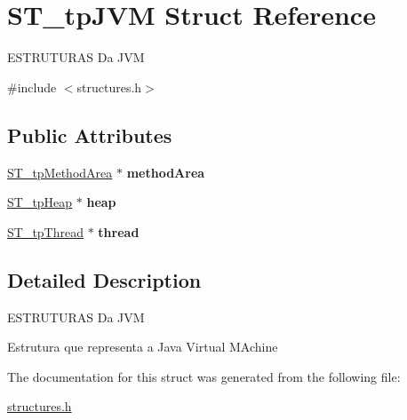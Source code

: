 \hypertarget{structST__tpJVM}{}\section{S\+T\+\_\+tp\+J\+VM Struct Reference}
\label{structST__tpJVM}




 E\+S\+T\+R\+U\+T\+U\+R\+AS Da J\+VM  




{\ttfamily \#include $<$structures.\+h$>$}

\subsection*{Public Attributes}
\begin{DoxyCompactItemize}
\item 
\mbox{\label{structST__tpJVM_a1028f9cd5f657644b0245b78fc269296}} 
\mbox{\hyperlink{structST__tpMethodArea}{S\+T\+\_\+tp\+Method\+Area}} $\ast$ {\bfseries method\+Area}
\item 
\mbox{\label{structST__tpJVM_a07243e1e5c2cee9cf771011553b7ff69}} 
\mbox{\hyperlink{structST__tpHeap}{S\+T\+\_\+tp\+Heap}} $\ast$ {\bfseries heap}
\item 
\mbox{\label{structST__tpJVM_ab34e610029c6442bffc4f8fd8f42c54b}} 
\mbox{\hyperlink{structures_8h_afd892ddd9ad4b7f9600350a3d42d683e}{S\+T\+\_\+tp\+Thread}} $\ast$ {\bfseries thread}
\end{DoxyCompactItemize}


\subsection{Detailed Description}


 E\+S\+T\+R\+U\+T\+U\+R\+AS Da J\+VM 

Estrutura que representa a Java Virtual M\+Achine 

The documentation for this struct was generated from the following file\+:\begin{DoxyCompactItemize}
\item 
\mbox{\hyperlink{structures_8h}{structures.\+h}}\end{DoxyCompactItemize}
